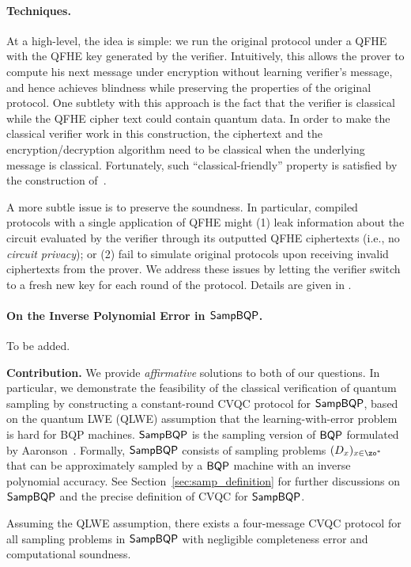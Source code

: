 \paragraph{Techniques.} At a high-level, the idea is simple: we run the original protocol under a QFHE with the QFHE key generated by the verifier. Intuitively, this allows the prover to compute his next message under encryption without learning verifier's message, and hence achieves blindness while preserving the properties of the original protocol.
One subtlety with this approach is the fact that the verifier is classical while the QFHE cipher text could contain quantum data.
In order to make the classical verifier work in this construction, the ciphertext and the encryption/decryption algorithm need to be classical when the underlying message is classical. Fortunately, such  ``classical-friendly'' property is satisfied by the construction of~\cite{mahadev_qfhe,??}.

A more subtle issue is to preserve the soundness.
In particular, compiled protocols with a single application of QFHE might (1) leak information about the circuit evaluated by the verifier through its outputted QFHE ciphertexts (i.e., no \emph{circuit privacy});
or (2) fail to simulate original protocols upon receiving invalid ciphertexts from the prover.
We address these issues by letting the verifier switch to a fresh new key for each round of the protocol. 
Details are given in .

\paragraph{On the Inverse Polynomial Error in $\operatorname{\mathsf{SampBQP}}$.} To be added. 



\iffalse

\vspace{2mm} \noindent \textbf{Contribution.} We provide \emph{affirmative} solutions to both of our questions.
In particular, we demonstrate the feasibility of the classical verification of quantum sampling by
constructing a constant-round CVQC protocol for $\operatorname{\mathsf{SampBQP}}$, based on the quantum LWE (QLWE) assumption that the learning-with-error problem is hard for BQP machines. 
$\operatorname{\mathsf{SampBQP}}$ is the sampling version of $\operatorname{\mathsf{BQP}}$ formulated by Aaronson~\cite{aaronson_2013}.
Formally, $\operatorname{\mathsf{SampBQP}}$ consists of sampling problems $(D_x)_{x\in\zo^*}$ that can be approximately sampled by a $\operatorname{\mathsf{BQP}}$ machine with an inverse polynomial accuracy. See Section~\ref{sec:samp_definition} for further discussions on $\operatorname{\mathsf{SampBQP}}$ and the precise definition of CVQC for $\operatorname{\mathsf{SampBQP}}$.   \begin{theorem}[informal] \label{thm:qpip0-informal}
Assuming the QLWE assumption, there exists a four-message CVQC protocol for all sampling problems in $\operatorname{\mathsf{SampBQP}}$ with negligible completeness error and computational soundness.
\end{theorem}

